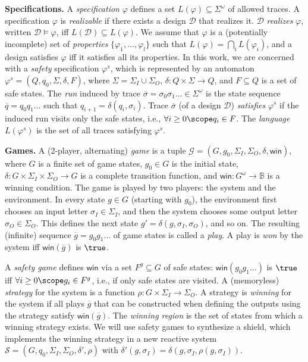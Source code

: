 \documentclass{llncs}
\newcommand{\win}{\mathsf{win}}
\newcommand{\B}{\mathbb{B}}
\newcommand{\design}{\mathcal{D}}
\newcommand{\shield}{\mathcal{S}}
\newcommand{\game}{\mathcal{G}}
\newcommand{\gstates}{G}
\newcommand{\ginit}{g_0}
\newcommand{\states}{Q}
\newcommand{\init}{q_0}
\newcommand{\dinalph}{\Sigma_I}
\newcommand{\dinletter}{{\sigma_I}}
\newcommand{\doutalph}{\Sigma_O}
\newcommand{\doutletter}{{\sigma_O}}
\newcommand{\dalph}{\Sigma}
\newcommand{\dletter}{\sigma}
\newcommand{\dtrace}{\overline{\dletter}}
\newcommand{\lang}{L}
\newcommand{\spec}{\varphi}
\begin{document}
\noindent
\textbf{Specifications.}
A \emph{specification} $\spec$ defines a set $\lang(\spec) \subseteq 
\dalph^\omega$ of allowed traces.  A specification $\spec$ is 
\emph{realizable} if there exists a design $\design$ that realizes it. 
$\design$ \emph{realizes} $\spec$, written $\design \models \spec$, iff 
$\lang(\design) \subseteq \lang(\spec)$.
We assume that $\spec$ is a (potentially incomplete) set of 
\emph{properties} $\{\spec_1,\ldots,\spec_l\}$ such that $\lang(\spec) = 
\bigcap_i \lang(\spec_i)$, and a design satisfies $\spec$ iff it 
satisfies all its properties.
In this work, we are concerned with a \emph{safety} specification 
$\spec^s$, which is represented by an automaton $\spec^s = (\states, 
\init, \dalph, \delta, F)$, where $\dalph = \dinalph\cup\doutalph$, 
$\delta : \states \times \dalph \rightarrow \states$, and $F\subseteq 
\states$ is a set of safe states.  The \emph{run} induced by trace 
$\dtrace = \dletter_0 \dletter_1 \ldots \in \dalph^\omega$ is the state 
sequence $\overline{q} = q_0 q_1 \ldots $ such that $q_{i+1} = 
\delta(q_i, \dletter_i)$.  Trace $\dtrace$ (of a design $\design$) 
\emph{satisfies} $\spec^s$ if the induced run visits only the safe 
states, i.e., $\forall i\geq 0 \scope q_i \in F$.  The \emph{language} 
$\lang(\spec^s)$ is the set of all traces satisfying $\spec^s$.  


\noindent
\textbf{Games.}
A (2-player, alternating) \emph{game} is a tuple $\game = (\gstates, 
\ginit, \dinalph, \doutalph, \delta, \win)$, where $\gstates$ is a 
finite set of game states, $\ginit \in \gstates$ is the initial state, 
$\delta: \gstates \times \dinalph \times \doutalph \rightarrow \gstates$ 
is a complete transition function, and $\win: \gstates^\omega 
\rightarrow \B$ is a winning condition.  The game is played by two 
players: the system and the environment.  In every state $g\in \gstates$ 
(starting with $\ginit$), the environment first chooses an input letter 
$\dinletter \in \dinalph$, and then the system chooses some output 
letter $\doutletter \in \doutalph$. This defines the next state $g' = 
\delta(g,\dinletter, \doutletter)$, and so on. The resulting (infinite) 
sequence $\overline{g} = g_0 g_1 \ldots$ of game states is called a 
\emph{play}.  A play is \emph{won} by the system iff 
$\win(\overline{g})$ is $\true$.

A \emph{safety game} defines $\win$ via a set $F^g\subseteq \gstates$ of 
safe states: $\win(g_0 g_1 \ldots)$ is $\true$ iff $\forall i \geq 0 
\scope g_i \in F^g$, i.e., if only safe states are visited.
A (memoryless) \emph{strategy} for the system is a function $\rho: 
\gstates \times \dinalph \rightarrow \doutalph$. A strategy is 
\emph{winning} for the system if all plays $\overline{g}$ that can be 
constructed when defining the outputs using the strategy satisfy 
$\win(\overline{g})$. The \emph{winning region} is the set of states 
from which a winning strategy exists. We will use safety games to 
synthesize a shield, which implements the winning strategy in a new 
reactive system $\shield = (\gstates, \init, \dinalph, \doutalph, 
\delta', \rho)$ with $\delta'(g,\dinletter) = 
\delta(g,\dinletter,\rho(g,\dinletter))$.
\end{document}
